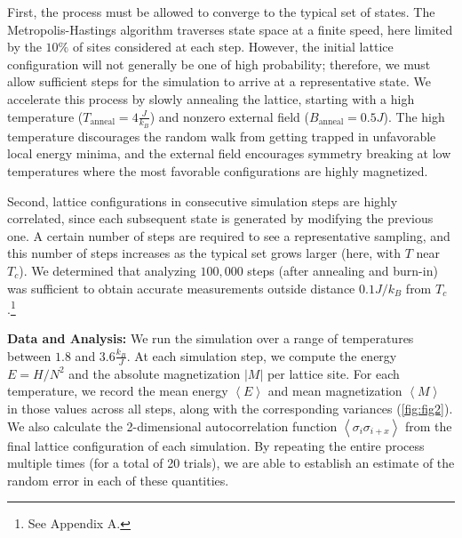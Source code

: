 \documentclass[letter,scriptaddress,twocolumn, prl,nofootinbib]{revtex4}
\newcommand{\submin}[1]{\left\langle #1 \right\rangle}
\begin{document}
First, the process must be allowed to converge to the typical set of states. The Metropolis-Hastings algorithm traverses state space at a finite speed, here limited by the $10\%$ of sites considered at each step. However, the initial lattice configuration will not generally be one of high probability; therefore, we must allow sufficient steps for the simulation to arrive at a representative state. We accelerate this process by slowly annealing the lattice, starting with a high temperature ($T_\text{anneal} = 4 \frac{J}{k_B}$) and nonzero external field ($B_\text{anneal} = 0.5 J$). The high temperature discourages the random walk from getting trapped in unfavorable local energy minima, and the external field encourages symmetry breaking at low temperatures where the most favorable configurations are highly magnetized.

Second, lattice configurations in consecutive simulation steps are highly correlated, since each subsequent state is generated by modifying the previous one. A certain number of steps are required to see a representative sampling, and this number of steps increases as the typical set grows larger (here, with $T$ near $T_c$). We determined that analyzing $100,000$ steps (after annealing and burn-in) was sufficient to obtain accurate measurements outside distance $0.1 J/k_B$ from $T_c$.\footnote{See Appendix A.}

\textbf{Data and Analysis:} We run the simulation over a range of temperatures between $1.8$ and $3.6\frac{k_B}{J}$. At each simulation step, we compute the energy $E = H / N^2$ and the absolute magnetization $|M|$ per lattice site. For each temperature, we record the mean energy $\submin{E}$ and mean magnetization $\submin{M}$ in those values across all steps, along with the corresponding variances (\autoref{fig:fig2}). We also calculate the 2-dimensional autocorrelation function $\submin{\sigma_i\sigma_{i + x}}$ from the final lattice configuration of each simulation. By repeating the entire process multiple times (for a total of 20 trials), we are able to establish an estimate of the random error in each of these quantities.
\end{document}
